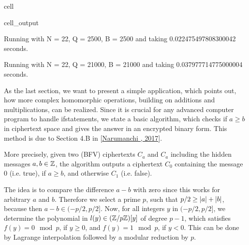 \documentclass[letterpaper,10pt,english]{jupyterBook}
\begin{document}
\begin{sphinxuseclass}{cell}
\begin{sphinxVerbatimOutput}
\begin{sphinxuseclass}{cell_output}
\begin{sphinxVerbatim}[commandchars=\\\{\}]
Running with N = 2\PYGZca{}2, Q = 2\PYGZca{}500, B = 2\PYGZca{}500 and taking 0.022475497808300042 seconds.
\end{sphinxVerbatim}

\begin{sphinxVerbatim}[commandchars=\\\{\}]
Running with N = 2\PYGZca{}2, Q = 2\PYGZca{}1000, B = 2\PYGZca{}1000 and taking 0.037977714775000004 seconds.
\end{sphinxVerbatim}

\end{sphinxuseclass}\end{sphinxVerbatimOutput}

\end{sphinxuseclass}
\begin{DUlineblock}{0em}
\item[] 
\end{DUlineblock}

\sphinxAtStartPar
As the last section, we want to present a simple application, which points out, how more complex homomorphic operations, building on additions and multiplications, can be realized.
Since it is crucial for any advanced computer program to handle if\sphinxhyphen{}statements, we state a basic algorithm, which checks if \(a \ge b\) in ciphertext space and gives the answer in an encrypted binary form.
This method is due to Section 4.B in {[}\hyperlink{cite.Thesis:id79}{Narumanchi , 2017}{]}.

\sphinxAtStartPar
More precisely, given two (BFV) ciphertexts \(C_a\) and \(C_a\) including the hidden messages \(a, b \in \mathbb Z\), the algorithm outputs a ciphertext \(C_0\) containing the message \(0\) (i.e. true), if \(a \ge b\), and otherwise \(C_1\) (i.e. false).

\sphinxAtStartPar
The idea is to compare the difference \(a-b\) with zero since this works for arbitrary \(a\) and \(b\).
Therefore we select a prime \(p\), such that \(p/2 \ge \left\lvert a \right\rvert + \left\lvert b \right\rvert\), because then \(a-b \in (-p/2,p/2]\).
Now, for all integers \(y\) in \((-p/2,p/2]\), we determine the polynomial in \(l(y) \in (\mathbb Z/p\mathbb Z)[y]\) of degree \(p-1\), which satisfies \(f(y) = 0 \mod p\), if \(y \ge 0\), and \(f(y) = 1 \mod p\), if \(y < 0\).
This can be done by Lagrange interpolation followed by a modular reduction by \(p\).
\end{document}
